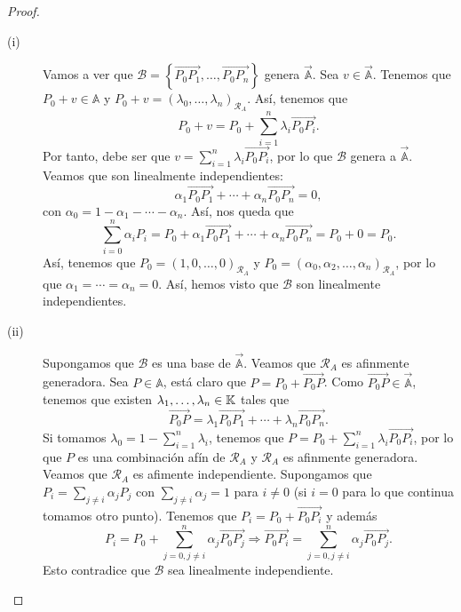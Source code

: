 \begin{proof}
\begin{description}
	\item[(i)] Vamos a ver que $\displaystyle \mathcal{B}= \left\{ \overrightarrow{P_{0}P_{1}}, \ldots, \overrightarrow{P_{0}P_{n}}\right\}  $ genera $\displaystyle \vec{\mathbb{A}} $. Sea $\displaystyle v \in \vec{\mathbb{A}} $. Tenemos que $\displaystyle P_{0} + v \in \mathbb{A} $ y $\displaystyle P_{0}+v = \left(\lambda_{0}, \ldots, \lambda_{n}\right)_{\mathcal{R}_{A}} $. Así, tenemos que
		\[P_{0} + v = P_{0} + \sum^{n}_{i = 1}\lambda_{i}\overrightarrow{P_{0}P_{i}} .\]
		Por tanto, debe ser que $\displaystyle v = \sum^{n}_{i = 1}\lambda_{i}\overrightarrow{P_{0}P_{i}} $, por lo que $\displaystyle \mathcal{B} $ genera a $\displaystyle \vec{\mathbb{A}} $. Veamos que son linealmente independientes:
		\[ \alpha_{1}\overrightarrow{P_{0}P_{1}} + \cdots + \alpha_{n}\overrightarrow{P_{0}P_{n}} = 0 ,\]
con $\displaystyle \alpha_{0} = 1 - \alpha_{1} - \cdots -\alpha_{n} $. Así, nos queda que
\[\sum^{n}_{i = 0}\alpha_{i}P_{i} = P_{0} + \alpha_{1}\overrightarrow{P_{0}P_{1}} + \cdots + \alpha_{n}\overrightarrow{P_{0}P_{n}} = P_{0} + 0 = P_{0} .\]
Así, tenemos que $\displaystyle P_{0} = \left(1, 0, \ldots, 0\right)_{\mathcal{R}_{A}} $ y $\displaystyle P_{0} = \left(\alpha_{0}, \alpha_{2}, \ldots, \alpha_{n}\right)_{\mathcal{R}_{A}} $, por lo que $\displaystyle \alpha_{1} = \cdots= \alpha_{n} = 0 $. Así, hemos visto que $\displaystyle \mathcal{B} $ son linealmente independientes.
\item[(ii)] Supongamos que $\displaystyle \mathcal{B} $ es una base de $\displaystyle \vec{\mathbb{A}} $. Veamos que $\displaystyle \mathcal{R}_{A} $ es afinmente generadora. Sea $\displaystyle P \in \mathbb{A} $, está claro que $\displaystyle P = P_{0} + \overrightarrow{P_{0}P} $. Como $\displaystyle \overrightarrow{P_{0}P} \in \vec{\mathbb{A}}$, tenemos que existen $\displaystyle \lambda_{1}, \ldots, \lambda_{n} \in \mathbb{K} $ tales que
	\[\overrightarrow{P_{0}P} = \lambda_{1}\overrightarrow{P_{0}P_{1}} + \cdots + \lambda_{n}\overrightarrow{P_{0}P_{n}} .\]
	Si tomamos $\displaystyle \lambda_{0} = 1 - \sum^{n}_{i = 1}\lambda_{i} $, tenemos que $\displaystyle P = P_{0} + \sum^{n}_{i = 1}\lambda_{i}\overrightarrow{P_{0}P_{i}} $, por lo que $\displaystyle P $ es una combinación afín de $\displaystyle \mathcal{R}_{A} $ y $\displaystyle \mathcal{R}_{A} $ es afinmente generadora. Veamos que $\displaystyle \mathcal{R}_{A} $ es afimente independiente. 
Supongamos que $\displaystyle P_{i} = \sum_{j \neq i}\alpha_{j}P_{j} $ con $\displaystyle \sum_{j \neq i}\alpha_{j} = 1 $ para $\displaystyle i \neq 0 $ (si $\displaystyle i = 0 $ para lo que continua tomamos otro punto). Tenemos que $\displaystyle P_{i} = P_{0} + \overrightarrow{P_{0}P_{i}} $ y además
\[P_{i} = P_{0} + \sum^{n}_{j = 0, j \neq i} \alpha_{j}\overrightarrow{P_{0}P_{j}} \Rightarrow \overrightarrow{P_{0}P_{i}} = \sum^{n}_{j = 0, j\neq i}\alpha_{j}\overrightarrow{P_{0}P_{j}}.\]
Esto contradice que $\displaystyle \mathcal{B} $ sea linealmente independiente.
\end{description}
\end{proof}
